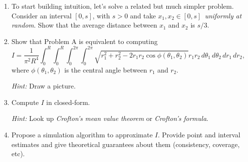 \documentclass[a4paper,10pt, notitlepage]{report}
\begin{document}
\begin{enumerate}
 \item To start building intuition, let's solve a related but much simpler problem.
 Consider an interval $[0, s]$, with $s>0$ and take $x_1,x_2 \in [0, s]$~\textit{uniformly at random}.
 Show that the average distance between $x_1$ and $x_2$ is $s/3$.
 \item Show that Problem A is equivalent to computing
 \begin{equation*}
  I = \frac{1}{\pi^2 R^4}\int_{0}^{R}\int_{0}^{R}\int_{0}^{2\pi}\int_{0}^{2\pi}\sqrt{r_1^2 + r_2^2 - 2r_1r_2\cos\phi(\theta_1, \theta_2)}r_1r_2\,d\theta_1\,d\theta_2\,dr_1\,dr_2,
 \end{equation*}
 where $\phi(\theta_1, \theta_2)$ is the central angle between $r_1$ and $r_2$.
 
 \textit{Hint:} Draw a picture.
 \item Compute $I$ in closed-form.

 \textit{Hint:} Look up \textit{Crofton's mean value theorem} or \textit{Crofton's formula}. 
 \item Propose a simulation algorithm to approximate $I$.
 Provide point and interval estimates and give theoretical guarantees about them (consistency, coverage, etc).
\end{enumerate}

% 
% 
% 
\end{document}
